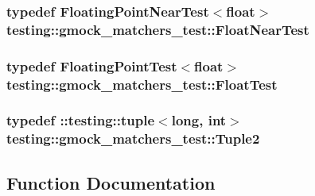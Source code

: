 \subsubsection[{\texorpdfstring{Float\+Near\+Test}{FloatNearTest}}]{\setlength{\rightskip}{0pt plus 5cm}typedef {\bf Floating\+Point\+Near\+Test}$<$float$>$ {\bf testing\+::gmock\+\_\+matchers\+\_\+test\+::\+Float\+Near\+Test}}\hypertarget{namespacetesting_1_1gmock__matchers__test_a426b51f464dcb48033946e1bf3cc8795}{}\label{namespacetesting_1_1gmock__matchers__test_a426b51f464dcb48033946e1bf3cc8795}
\subsubsection[{\texorpdfstring{Float\+Test}{FloatTest}}]{\setlength{\rightskip}{0pt plus 5cm}typedef {\bf Floating\+Point\+Test}$<$float$>$ {\bf testing\+::gmock\+\_\+matchers\+\_\+test\+::\+Float\+Test}}\hypertarget{namespacetesting_1_1gmock__matchers__test_a145329e433869625f9f0e98a0cdfd7b4}{}\label{namespacetesting_1_1gmock__matchers__test_a145329e433869625f9f0e98a0cdfd7b4}
\subsubsection[{\texorpdfstring{Tuple2}{Tuple2}}]{\setlength{\rightskip}{0pt plus 5cm}typedef \+::testing\+::tuple$<$long, int$>$ {\bf testing\+::gmock\+\_\+matchers\+\_\+test\+::\+Tuple2}}\hypertarget{namespacetesting_1_1gmock__matchers__test_a8b82c859cd28da9e7f7d4c6091a3165c}{}\label{namespacetesting_1_1gmock__matchers__test_a8b82c859cd28da9e7f7d4c6091a3165c}


\subsection{Function Documentation}
